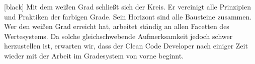 \documentclass[a5paper, landscape]{article}
\begin{document}
	\newpage
	[black]
	\noindent Mit dem weißen Grad schließt sich der Kreis. Er vereinigt alle Prinzipien und Praktiken der farbigen Grade. Sein Horizont sind alle Bausteine zusammen. Wer den weißen Grad erreicht hat, arbeitet ständig an allen Facetten des Wertesystems. Da solche gleichschwebende Aufmerksamkeit jedoch schwer herzustellen ist, erwarten wir, dass der Clean Code Developer nach einiger Zeit wieder mit der Arbeit im Gradesystem von vorne beginnt.
\end{document}
